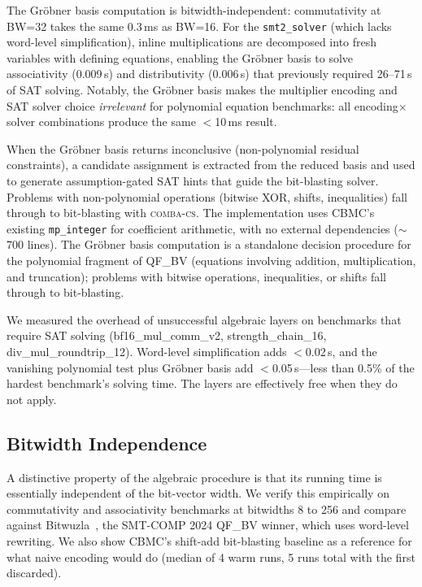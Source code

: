 \documentclass[runningheads]{llncs}
\newcommand{\combacs}{\textsc{comba-cs}\xspace}
\newcommand{\cbmc}{\textsc{CBMC}\xspace}
\begin{document}
The Gr\"obner basis computation is bitwidth-independent: commutativity
at BW=32 takes the same 0.3\,ms as BW=16. For the
\texttt{smt2\_solver} (which lacks word-level simplification), inline
multiplications are decomposed into fresh variables with defining
equations, enabling the Gr\"obner basis to solve associativity
(0.009\,s) and distributivity (0.006\,s) that previously required
26--71\,s of SAT solving. Notably, the Gr\"obner basis makes the
multiplier encoding and SAT solver choice \emph{irrelevant} for
polynomial equation benchmarks: all encoding$\times$solver
combinations produce the same $<$10\,ms result.

When the Gr\"obner basis returns inconclusive (non-polynomial
residual constraints), a candidate assignment is extracted from the
reduced basis and used to generate assumption-gated SAT hints that
guide the bit-blasting solver. Problems with non-polynomial
operations (bitwise XOR, shifts, inequalities) fall through to
bit-blasting with \combacs. The implementation uses \cbmc's existing
\texttt{mp\_integer} for coefficient arithmetic, with no external
dependencies ($\sim$700 lines). The Gr\"obner basis computation is
a standalone decision procedure for the polynomial fragment of
QF\_BV (equations involving addition, multiplication, and
truncation); problems with bitwise operations, inequalities, or
shifts fall through to bit-blasting.

We measured the overhead of unsuccessful algebraic layers on
benchmarks that require SAT solving (bf16\_mul\_comm\_v2,
strength\_chain\_16, div\_mul\_roundtrip\_12). Word-level
simplification adds $<$0.02\,s, and the vanishing polynomial test
plus Gr\"obner basis add $<$0.05\,s---less than 0.5\% of the
hardest benchmark's solving time. The layers are effectively free
when they do not apply.

\subsection{Bitwidth Independence}
\label{sec:scaling}

A distinctive property of the algebraic procedure is that its
running time is essentially independent of the bit-vector width.
We verify this empirically on commutativity and associativity
benchmarks at bitwidths 8 to 256 and compare against
Bitwuzla~\cite{niemetz2023bitwuzla}, the SMT-COMP 2024 QF\_BV
winner, which uses word-level rewriting. We also show \cbmc's
shift-add bit-blasting baseline as a reference for what naive
encoding would do (median of 4 warm runs, 5 runs total with the
first discarded).
\end{document}
